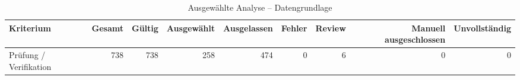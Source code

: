 \begin{table}[htbp]
\centering
\caption{Ausgewählte Analyse -- Datengrundlage}
\begin{tabular}{lrrrrrrrr}
\toprule
Kriterium & Gesamt & Gültig & Ausgewählt & Ausgelassen & Fehler & Review & Manuell ausgeschlossen & Unvollständig \\
\midrule
Prüfung / Verifikation & 738 & 738 & 258 & 474 & 0 & 6 & 0 & 0 \\
\bottomrule
\end{tabular}
\end{table}
